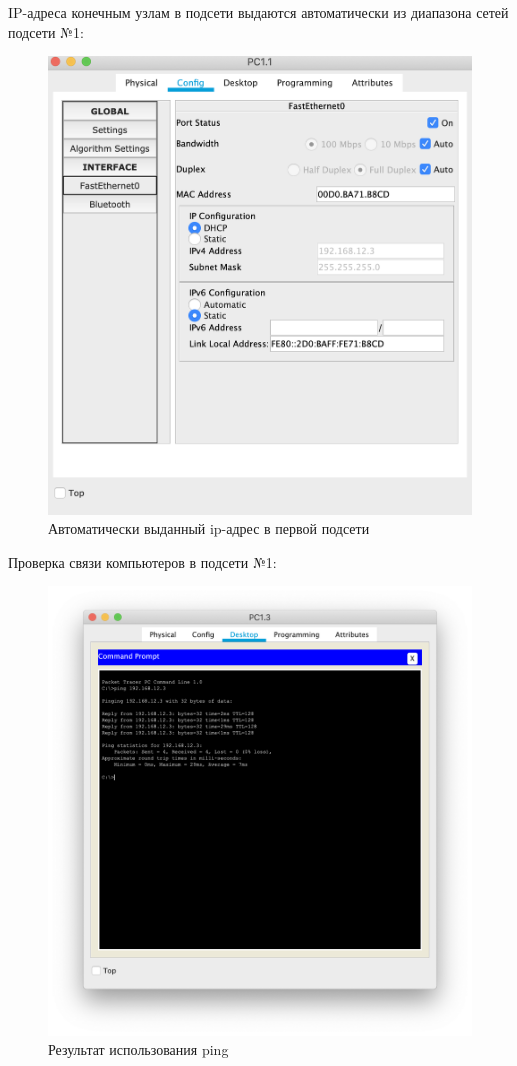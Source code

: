 IP-адреса конечным узлам в подсети выдаются автоматически из диапазона сетей подсети №1:

\begin{figure}[H]
    \centering
    \includegraphics[width=0.7\linewidth]{images/net_1_machine.png}
    \caption{Автоматически выданный ip-адрес в первой подсети}%
\end{figure}


Проверка связи компьютеров в подсети №1:
\begin{figure}[H]
    \centering
    \includegraphics[width=0.8\linewidth]{images/net_1_ping.png}
    \caption{Результат использования ping}%
\end{figure}

